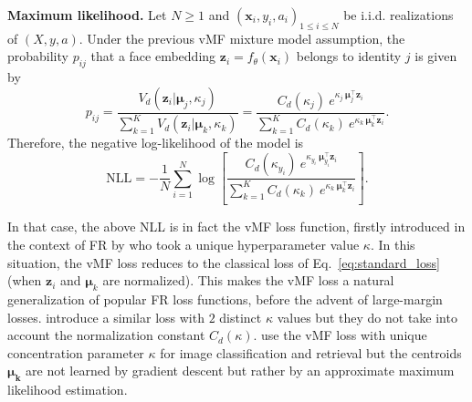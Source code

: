 \documentclass[nohyperref]{article}
\theoremstyle{plain}
\theoremstyle{definition}
\theoremstyle{remark}
\newcommand{\vect}[1]{{\bm{#1}}}
\begin{document}
{\bf Maximum likelihood.} Let $N\geq 1$ and $(\vect{x}_i, y_i, a_i)_{1 \leq i \leq N}$ be i.i.d. realizations of $(X,y,a)$. Under the previous vMF mixture model assumption, the probability $p_{ij}$ that a face embedding $\vect{z}_i = f_\theta(\vect{x}_i)$ belongs to identity $j$ is given by
\[ p_{ij} = \frac{V_d(\vect{z}_i|\vect{\mu}_j, \kappa_j)}{\sum_{k=1}^K V_d(\vect{z}_i|\vect{\mu}_k, \kappa_k)}= \frac{  C_d(\kappa_j) \ e^{\displaystyle \kappa_j \ \vect{\mu}_j^\intercal \vect{z}_i}}{\sum_{k=1}^K  C_d(\kappa_k) \ e^{\displaystyle \kappa_k \ \vect{\mu}_k^\intercal \vect{z}_i}}. \]
Therefore, the negative log-likelihood of the model is
\begin{equation} \label{eq:NLL-vMF}
   \mathrm{NLL} =  -\frac{1}{N} \sum_{i=1}^N \log \left[ \frac{ C_d(\kappa_{y_i}) \ e^{\displaystyle \kappa_{y_i} \ \vect{\mu}_{y_i}^\intercal \vect{z}_i}}{\sum_{k=1}^K  C_d(\kappa_k) \ e^{\displaystyle \kappa_k \ \vect{\mu}_k^\intercal \vect{z}_i}} \right].
\end{equation}  

In that case, the above NLL is in fact the vMF loss function, firstly introduced in
the context of FR by \cite{vmf_deep_learning}  who took a unique hyperparameter value $\kappa$. In this situation, the vMF loss reduces to the classical loss of Eq.~\ref{eq:standard_loss} (when $\vect{z}_i$ and $\vect{\mu}_k$ are normalized). This makes the vMF loss a natural generalization of popular FR loss functions, before the advent of large-margin losses. \cite{adaptive_margin_loss} introduce a similar loss with $2$ distinct $\kappa$ values but they do not take into account the normalization constant $C_d(\kappa)$. \cite{vmf_classification} use the vMF loss with unique concentration parameter $\kappa$ for image classification and retrieval but the centroids $\vect{\mu_k}$ are not learned by gradient descent but rather by an approximate maximum likelihood estimation. 
\end{document}
